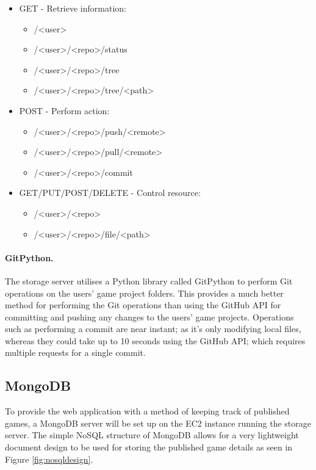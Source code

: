 	\begin{itemize}
		\item GET - Retrieve information:
		\begin{itemize}
			\item /<user>
			\item /<user>/<repo>/status
			\item /<user>/<repo>/tree
			\item /<user>/<repo>/tree/<path>
		\end{itemize}
		\item POST - Perform action:
		\begin{itemize}
			\item /<user>/<repo>/push/<remote>
			\item /<user>/<repo>/pull/<remote>
			\item /<user>/<repo>/commit
		\end{itemize}
		\item GET/PUT/POST/DELETE - Control resource:
		\begin{itemize}
			\item /<user>/<repo>
			\item /<user>/<repo>/file/<path>
		\end{itemize}
	\end{itemize}

	\paragraph{GitPython.}
	The storage server utilises a Python library called GitPython to perform Git operations on the users' game project folders. This provides a much better method for performing the Git operations than using the GitHub API for committing and pushing any changes to the users' game projects. Operations such as performing a commit are near instant; as it's only modifying local files, whereas they could take up to 10 seconds using the GitHub API; which requires multiple requests for a single commit.

	\subsection{MongoDB}
	To provide the web application with a method of keeping track of published games, a MongoDB server will be set up on the EC2 instance running the storage server. The simple NoSQL structure of MongoDB allows for a very lightweight document design to be used for storing the published game details as seen in Figure \ref{fig:nosqldesign}.

